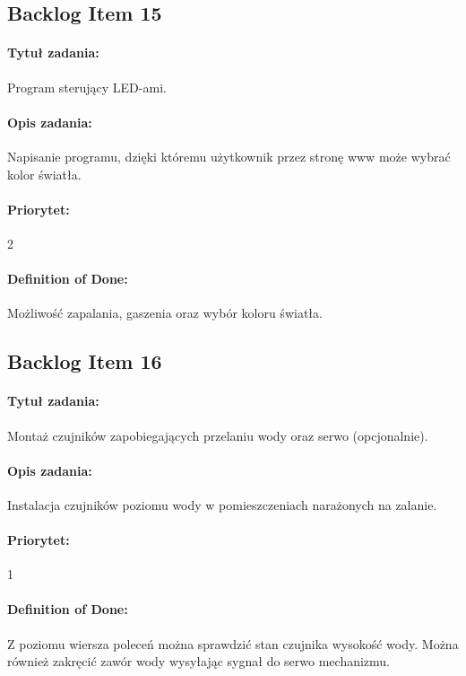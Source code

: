 
	\subsection{Backlog Item 15}
	\paragraph{Tytuł zadania:}
	Program sterujący LED-ami.
	
	\paragraph{Opis zadania:}
	Napisanie programu, dzięki któremu użytkownik przez stronę www może wybrać kolor światła.
	
	\paragraph{Priorytet:}
	2
	
	\paragraph{Definition of Done:}
	Możliwość zapalania, gaszenia oraz wybór koloru światła.


	
	\subsection{Backlog Item 16}
	\paragraph{Tytuł zadania:}
	Montaż czujników zapobiegających przelaniu wody oraz serwo (opcjonalnie).
	
	\paragraph{Opis zadania:} 
	Instalacja czujników poziomu wody w pomieszczeniach narażonych na zalanie.
	
	\paragraph{Priorytet:} 
	1
	
	\paragraph{Definition of Done:}
	Z poziomu wiersza poleceń można sprawdzić stan czujnika wysokość wody. Można również zakręcić zawór wody wysyłając sygnał do serwo mechanizmu.

